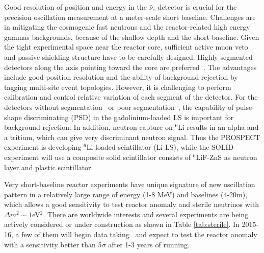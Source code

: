 Good resolution of position and energy in the $\bar\nu_e$ detector is 
crucial for the precision oscillation measurement at a meter-scale short baseline. Challenges 
are in mitigating the cosmogenic fast neutrons and the reactor-related high energy gammas backgrounds, because of the shallow depth and the short-baseline. Given the tight experimental space near the reactor core, sufficient active muon veto and passive shielding structure have to be carefully designed. Highly segmented detectors along the axis pointing toward the core are preferred~\cite{PROSPECT,DANSS,SoLid,HANARO}. The advantages include good position resolution and the ability of background rejection by tagging multi-site event topologies. However, it is challenging to perform calibration and control relative variation of each segment of the detector. For the detectors without segmentation~\cite{NUCIFER-2010,NEUTRINO4-2014,POSEIDON} or poor segmentation~\cite{NUCIFER-2014}, the capability of pulse-shape discriminating (PSD) in the gadolinium-loaded LS is important for background rejection. In addition, neutron capture on $^6$Li results in an alpha and a tritium, which can give very discriminant neutron signal. Thus the PROSPECT experiment is developing $^6$Li-loaded scintillator (Li-LS), while the SOLID experiment will use a composite solid scintillator consists of $^6$LiF-ZnS as neutron layer and plastic scintillator.

Very short-baseline reactor experiments have unique signature of new oscillation pattern in a relatively large range of energy (1-8 MeV) and baselines (4-20m), which allows a good sensitivity to test reactor anomaly and sterile neutrinos with $\Delta m^2\sim1$eV$^2$. There are worldwide interests and several experiments are being 
actively considered or under construction as shown in Table \ref{tab:sterile}. In 2015-16, a few of them will begin data taking~\cite{Lhuillier-Neutrino14} and expect to test the reactor anomaly with a sensitivity better than 5$\sigma$ after 1-3 years of running.

